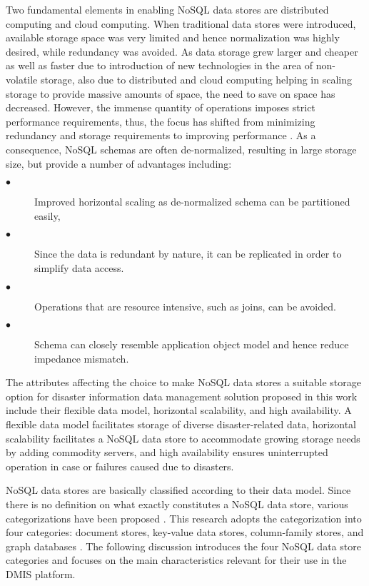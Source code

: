 Two fundamental elements in enabling NoSQL data stores are distributed computing and cloud computing. When traditional data stores were introduced, available storage space was very limited and hence normalization was highly desired, while redundancy was avoided. As data storage grew larger and cheaper as well as faster due to introduction of new technologies in the area of non-volatile storage, also due to distributed and cloud computing helping in scaling storage to provide massive amounts of space, the need to save on space has decreased. However, the immense quantity of operations imposes strict performance requirements, thus, the focus has shifted from minimizing redundancy and storage requirements to improving performance \cite{erl2013cloud}. As a consequence, NoSQL schemas are often de-normalized, resulting in large storage size, but provide a number of advantages including:

\begin{description}
	\item[$\bullet$]
	Improved horizontal scaling as de-normalized schema can be partitioned easily,
	
	\item[$\bullet$]
	Since the data is redundant by nature, it can be replicated in order to simplify data access.
	
	\item[$\bullet$]
	Operations that are resource intensive, such as joins, can be avoided.
	
	\item[$\bullet$]
	Schema can closely resemble application object model and hence reduce impedance mismatch.
\end{description}

The attributes affecting the choice to make NoSQL data stores a suitable storage option for disaster information data management solution proposed in this work include their flexible data model, horizontal scalability, and high availability. A flexible data model facilitates storage of diverse disaster-related data, horizontal scalability facilitates a NoSQL data store to accommodate growing storage needs by adding commodity servers, and high availability ensures uninterrupted operation in case or failures caused due to disasters.

NoSQL data stores are basically classified according to their data model. Since there is no definition on what exactly constitutes a NoSQL data store, various categorizations have been proposed \cite{cattell2011scalable}  \cite{sadalage2013nosql}. This research adopts the categorization into four categories: document stores, key-value data stores, column-family stores, and graph databases \cite{hecht2011nosql} \cite{sadalage2013nosql} \cite{cure2011data}. The following discussion introduces the four NoSQL data store categories and focuses on the main characteristics relevant for their use in the DMIS platform.

